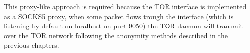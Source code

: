 
This proxy-like approach is required because the
TOR interface is implemented as a SOCKS5 proxy, when some packet flows
trough the interface (which is listening by default on localhost on port 9050)
the TOR daemon will transmit over the TOR network following the anonymity methods
described in the previous chapters.
